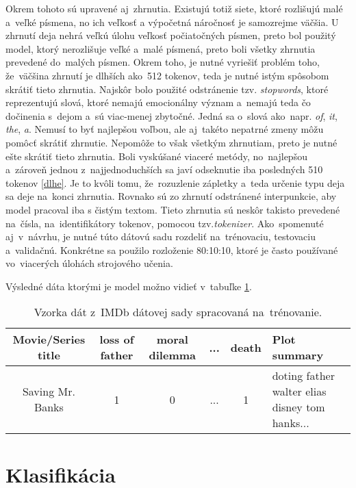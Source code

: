 Okrem tohoto sú upravené aj~zhrnutia. Existujú totiž siete, ktoré rozlišujú malé a~veľké písmena, no ich veľkosť a výpočetná náročnosť je samozrejme väčšia. U zhrnutí deja nehrá veľkú úlohu veľkosť počiatočných písmen, preto bol použitý model, ktorý nerozlišuje veľké a~malé písmená, preto boli všetky zhrnutia prevedené do~malých písmen. Okrem toho, je nutné vyriešiť problém toho, že~väčšina zhrnutí je dlhších ako~512 tokenov, teda je nutné istým spôsobom skrátiť tieto zhrnutia. Najskôr bolo použité odstránenie tzv. \textit{stopwords}, ktoré reprezentujú slová, ktoré nemajú emocionálny význam a~nemajú teda čo dočinenia s~dejom a~sú viac-menej zbytočné. Jedná sa o~slová ako~napr. \textit{of}, \textit{it}, \textit{the}, \textit{a}. Nemusí to byť najlepšou voľbou, ale aj~takéto nepatrné zmeny môžu pomôcť skrátiť zhrnutie. Nepomôže to však všetkým zhrnutiam, preto je nutné ešte skrátiť tieto zhrnutia. Boli vyskúšané viaceré metódy, no~najlepšou a~zároveň jednou z~najjednoduchších sa javí odseknutie iba posledných 510 tokenov \ref{dlhe}. Je to kvôli tomu, že~rozuzlenie zápletky a~teda určenie typu deja sa deje na~konci zhrnutia. Rovnako sú zo zhrnutí odstránené interpunkcie, aby model pracoval iba s čistým textom. Tieto zhrnutia sú neskôr takisto prevedené na~čísla, na~identifikátory tokenov, pomocou tzv.\textit{tokenizer}. Ako~spomenuté aj~v~návrhu, je nutné túto dátovú sadu rozdeliť na~trénovaciu, testovaciu a~validačnú. Konkrétne sa použilo rozloženie 80:10:10, ktoré je často používané vo~viacerých úlohách strojového učenia.

Výsledné dáta ktorými je model  možno vidieť v~tabuľke \ref{spracovane}.

\begin{table}[hbt]
\centering
\caption{Vzorka dát z~IMDb dátovej sady spracovaná na~trénovanie.}
\label{spracovane}
\begin{tabular}{|c|c|c|c|c|
>{\centering\arraybackslash}m{7em}|}
\hline
Movie/Series title & loss of father & moral dilemma & ... & death  & Plot summary \\
\hline
Saving Mr. Banks & 1 & 0  & ... & 1 &  doting father walter elias disney tom hanks...\\ 
\hline

\end{tabular}
\end{table}


\section{Klasifikácia}

